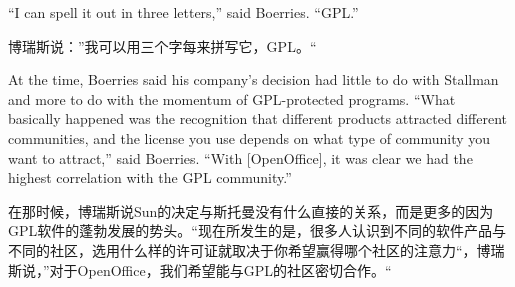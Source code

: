 

\ifdefined\eng
``I can spell it out in three letters,'' said Boerries. ``GPL.''
\fi

\ifdefined\chs
博瑞斯说：''我可以用三个字每来拼写它，GPL。``
\fi

\ifdefined\eng
At the time, Boerries said his company's decision had little to do with Stallman and more to do with the momentum of GPL-protected programs. ``What basically happened was the recognition that different products attracted different communities, and the license you use depends on what type of community you want to attract,'' said Boerries. ``With [OpenOffice], it was clear we had the highest correlation with the GPL community.''  %
\fi

\ifdefined\chs
在那时候，博瑞斯说Sun的决定与斯托曼没有什么直接的关系，而是更多的因为GPL软件的蓬勃发展的势头。``现在所发生的是，很多人认识到不同的软件产品与不同的社区，选用什么样的许可证就取决于你希望赢得哪个社区的注意力``，博瑞斯说，''对于OpenOffice，我们希望能与GPL的社区密切合作。`` %
\fi

